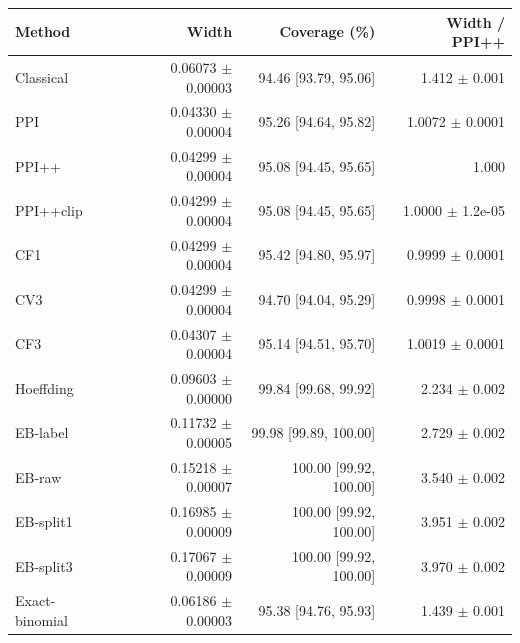 \small
\begin{tabular}{lrrr}
\toprule
Method & Width & Coverage (\%) & Width / PPI++ \\
\midrule
Classical & 0.06073 $\pm$ 0.00003 & 94.46 [93.79, 95.06] & 1.412 $\pm$ 0.001 \\
PPI & 0.04330 $\pm$ 0.00004 & 95.26 [94.64, 95.82] & 1.0072 $\pm$ 0.0001 \\
PPI++ & 0.04299 $\pm$ 0.00004 & 95.08 [94.45, 95.65] & 1.000 \\
PPI++clip & 0.04299 $\pm$ 0.00004 & 95.08 [94.45, 95.65] & 1.0000 $\pm$ 1.2e-05 \\
CF1 & 0.04299 $\pm$ 0.00004 & 95.42 [94.80, 95.97] & 0.9999 $\pm$ 0.0001 \\
CV3 & 0.04299 $\pm$ 0.00004 & 94.70 [94.04, 95.29] & 0.9998 $\pm$ 0.0001 \\
CF3 & 0.04307 $\pm$ 0.00004 & 95.14 [94.51, 95.70] & 1.0019 $\pm$ 0.0001 \\
Hoeffding & 0.09603 $\pm$ 0.00000 & 99.84 [99.68, 99.92] & 2.234 $\pm$ 0.002 \\
EB-label & 0.11732 $\pm$ 0.00005 & 99.98 [99.89, 100.00] & 2.729 $\pm$ 0.002 \\
EB-raw & 0.15218 $\pm$ 0.00007 & 100.00 [99.92, 100.00] & 3.540 $\pm$ 0.002 \\
EB-split1 & 0.16985 $\pm$ 0.00009 & 100.00 [99.92, 100.00] & 3.951 $\pm$ 0.002 \\
EB-split3 & 0.17067 $\pm$ 0.00009 & 100.00 [99.92, 100.00] & 3.970 $\pm$ 0.002 \\
Exact-binomial & 0.06186 $\pm$ 0.00003 & 95.38 [94.76, 95.93] & 1.439 $\pm$ 0.001 \\
\bottomrule
\end{tabular}
